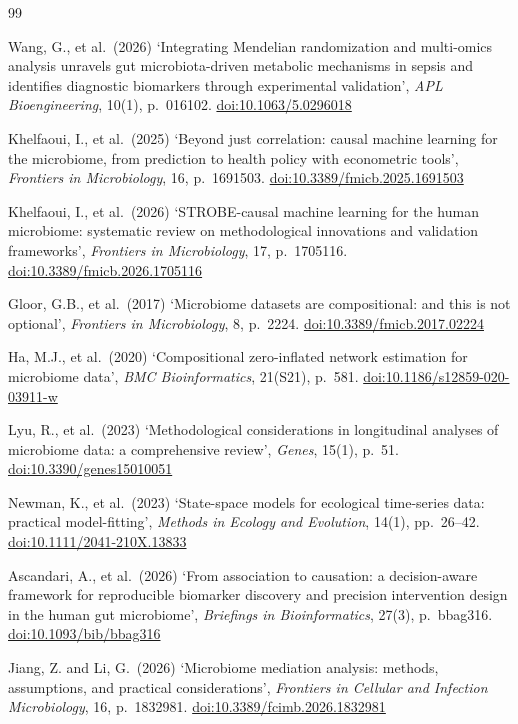 \documentclass[11pt]{article}
\newcommand{\doi}[1]{\href{https://doi.org/#1}{doi:#1}}
\begin{document}
\begin{thebibliography}{99}
\small

Wang, G., et al.\ (2026) `Integrating Mendelian randomization and multi-omics analysis unravels gut microbiota-driven metabolic mechanisms in sepsis and identifies diagnostic biomarkers through experimental validation', \textit{APL Bioengineering}, 10(1), p.\ 016102. \doi{10.1063/5.0296018}


Khelfaoui, I., et al.\ (2025) `Beyond just correlation: causal machine learning for the microbiome,
from prediction to health policy with econometric tools', \textit{Frontiers in Microbiology}, 16,
p.\ 1691503. \doi{10.3389/fmicb.2025.1691503}


Khelfaoui, I., et al.\ (2026) `STROBE-causal machine learning for the human microbiome: systematic
review on methodological innovations and validation frameworks', \textit{Frontiers in Microbiology},
17, p.\ 1705116. \doi{10.3389/fmicb.2026.1705116}


Gloor, G.B., et al.\ (2017) `Microbiome datasets are compositional: and this is not optional',
\textit{Frontiers in Microbiology}, 8, p.\ 2224. \doi{10.3389/fmicb.2017.02224}


Ha, M.J., et al.\ (2020) `Compositional zero-inflated network estimation for microbiome data',
\textit{BMC Bioinformatics}, 21(S21), p.\ 581. \doi{10.1186/s12859-020-03911-w}


Lyu, R., et al.\ (2023) `Methodological considerations in longitudinal analyses of microbiome data:
a comprehensive review', \textit{Genes}, 15(1), p.\ 51. \doi{10.3390/genes15010051}


Newman, K., et al.\ (2023) `State-space models for ecological time-series data: practical
model-fitting', \textit{Methods in Ecology and Evolution}, 14(1), pp.\ 26--42.
\doi{10.1111/2041-210X.13833}


Ascandari, A., et al.\ (2026) `From association to causation: a decision-aware framework for
reproducible biomarker discovery and precision intervention design in the human gut microbiome',
\textit{Briefings in Bioinformatics}, 27(3), p.\ bbag316.
\doi{10.1093/bib/bbag316}


Jiang, Z. and Li, G.\ (2026) `Microbiome mediation analysis: methods, assumptions, and practical considerations', \textit{Frontiers in Cellular and Infection Microbiology}, 16, p.\ 1832981. \doi{10.3389/fcimb.2026.1832981}



\end{thebibliography}
\end{document}
